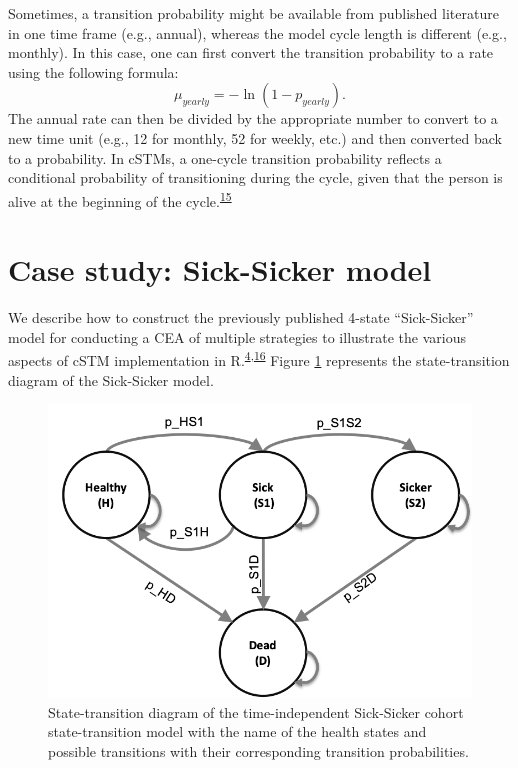 \documentclass[
]{article}
\begin{document}
Sometimes, a transition probability might be available from published literature in one time frame (e.g., annual), whereas the model cycle length is different (e.g., monthly). In this case, one can first convert the transition probability to a rate using the following formula:
\begin{equation}
    \mu_{yearly} = -\ln{\left(1-p_{yearly}\right)}.
    \label{eq:prob-to-rate-ann}
\end{equation}
The annual rate can then be divided by the appropriate number to convert to a new time unit (e.g., 12 for monthly, 52 for weekly, etc.) and then converted back to a probability. In cSTMs, a one-cycle transition probability reflects a conditional probability of transitioning during the cycle, given that the person is alive at the beginning of the cycle.\textsuperscript{\protect\hyperlink{ref-Miller1994}{15}}

\hypertarget{case-study-sick-sicker-model}{%
\section{Case study: Sick-Sicker model}\label{case-study-sick-sicker-model}}

We describe how to construct the previously published 4-state ``Sick-Sicker'' model for conducting a CEA of multiple strategies to illustrate the various aspects of cSTM implementation in R.\textsuperscript{\protect\hyperlink{ref-Krijkamp2018}{4},\protect\hyperlink{ref-Enns2015e}{16}} Figure \ref{fig:STD-Sick-Sicker} represents the state-transition diagram of the Sick-Sicker model.

\begin{figure}[H]

{\centering \includegraphics[width=10.64in]{figs/Sick-Sicker} 

}

\caption{State-transition diagram of the time-independent Sick-Sicker cohort state-transition model with the name of the health states and possible transitions with their corresponding transition probabilities.}\label{fig:STD-Sick-Sicker}
\end{figure}
\end{document}
